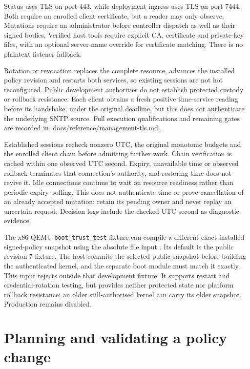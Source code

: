 Status uses TLS on port 443, while deployment ingress uses TLS on port 7444.
Both require an enrolled client certificate, but a reader may only observe.
Mutations require an administrator before controller dispatch as well as their
signed bodies. Verified host tools require explicit CA, certificate and private-key
files, with an optional server-name override for certificate matching. There is
no plaintext listener fallback.

Rotation or revocation replaces the complete resource, advances the installed
policy revision and restarts both services, so existing sessions are not hot
reconfigured. Public development authorities do not establish protected custody
or rollback resistance. Each client obtains a fresh positive time-service
reading before its handshake, under the original deadline, but this does not
authenticate the underlying SNTP source. Full execution qualifications and
remaining gates are recorded in \repofile|docs/reference/management-tls.md|.

Established sessions recheck nonzero UTC, the original monotonic budgets and
the enrolled client chain before admitting further work. Chain verification is
cached within one observed UTC second. Expiry, unavailable time or observed
rollback terminates that connection's authority, and restoring time does not revive
it. Idle connections continue to wait on resource readiness rather than periodic
expiry polling. This does not authenticate time or prove cancellation of an
already accepted mutation: retain its pending owner and never replay an uncertain
request. Decision logs include the checked UTC second as diagnostic evidence.

The x86 QEMU \texttt{boot\_trust\_test} fixture can compile a different exact
installed signed-policy snapshot using the absolute file input
. Its default is the public revision 7
fixture. The host commits the selected public snapshot before building the
authenticated kernel, and the separate boot module must match it exactly. This
input rejects outside that development fixture. It supports restart and
credential-rotation testing, but provides neither protected state nor platform
rollback resistance: an older still-authorised kernel can carry its older
snapshot. Production remains disabled.

\section{Planning and validating a policy change}

